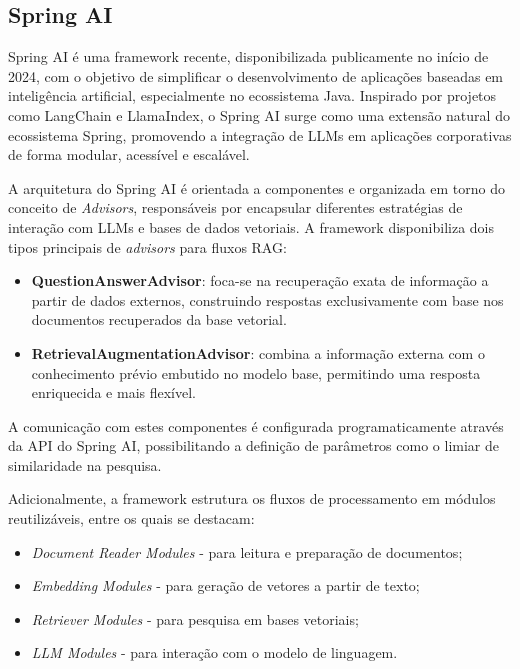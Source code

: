 \subsection{Spring AI}


Spring AI é uma framework recente, disponibilizada publicamente no início de 2024, com o objetivo de simplificar o desenvolvimento de aplicações baseadas em inteligência artificial, especialmente no ecossistema Java. Inspirado por projetos como LangChain e LlamaIndex, o Spring AI surge como uma extensão natural do ecossistema Spring, promovendo a integração de LLMs em aplicações corporativas de forma modular, acessível e escalável.


A arquitetura do Spring AI é orientada a componentes e organizada em torno do conceito de \emph{Advisors}, responsáveis por encapsular diferentes estratégias de interação com LLMs e bases de dados vetoriais. A framework disponibiliza dois tipos principais de \textit{advisors} para fluxos RAG:

\begin{itemize} 
        \item \textbf{QuestionAnswerAdvisor}: foca-se na recuperação exata de informação a partir de dados externos, construindo respostas exclusivamente com base nos documentos recuperados da base vetorial. 
        \item \textbf{RetrievalAugmentationAdvisor}: combina a informação externa com o conhecimento prévio embutido no modelo base, permitindo uma resposta enriquecida e mais flexível. 
\end{itemize}

A comunicação com estes componentes é configurada programaticamente através da API do Spring AI, possibilitando a definição de parâmetros como o limiar de similaridade na pesquisa.

Adicionalmente, a framework estrutura os fluxos de processamento em módulos reutilizáveis, entre os quais se destacam: 
\begin{itemize} 
        \item \emph{Document Reader Modules} - para leitura e preparação de documentos; 
        \item \emph{Embedding Modules} - para geração de vetores a partir de texto; \item \emph{Retriever Modules} - para pesquisa em bases vetoriais; 
        \item \emph{LLM Modules} - para interação com o modelo de linguagem. 
\end{itemize}

